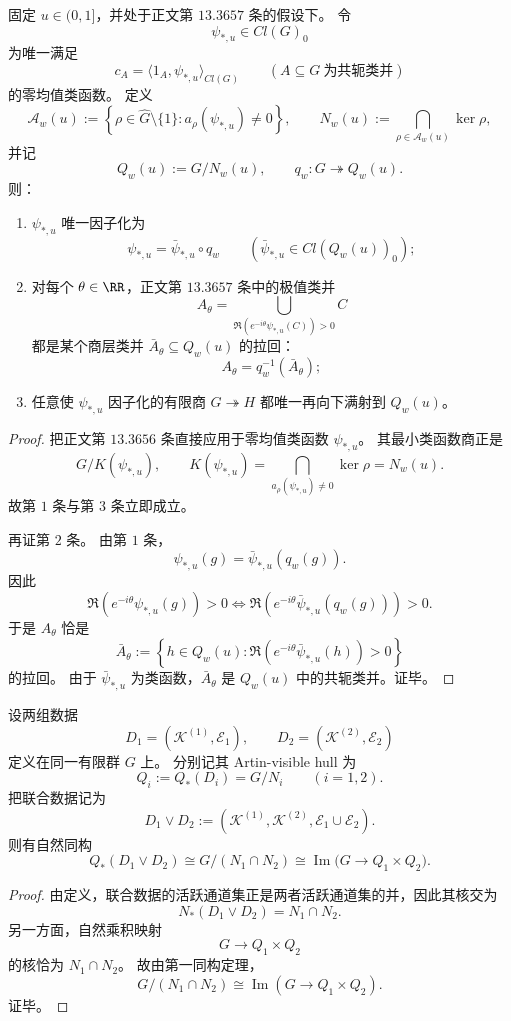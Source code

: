 \begin{theorem}[极大通道最优见证的唯一最小承载商]\label{thm:conclusion-artin-extremal-witness-minimal-hull}
固定 \(u\in(0,1]\)，并处于正文第 \(13.3657\) 条的假设下。
令
\[
\psi_{\ast,u}\in Cl(G)_0
\]
为唯一满足
\[
c_A=\langle 1_A,\psi_{\ast,u}\rangle_{Cl(G)}
\qquad
(A\subseteq G\ \text{为共轭类并})
\]
的零均值类函数。
定义
\[
\mathcal A_w(u)
:=
\left\{
\rho\in\widehat G\setminus\{1\}: a_\rho(\psi_{\ast,u})\neq 0
\right\},
\qquad
N_w(u):=\bigcap_{\rho\in\mathcal A_w(u)}\ker\rho,
\]
并记
\[
Q_w(u):=G/N_w(u),
\qquad
q_w:G\twoheadrightarrow Q_w(u).
\]
则：
\begin{enumerate}
  \item \(\psi_{\ast,u}\) 唯一因子化为
  \[
  \psi_{\ast,u}=\bar\psi_{\ast,u}\circ q_w
  \qquad
  (\bar\psi_{\ast,u}\in Cl(Q_w(u))_0);
  \]
  \item 对每个 \(\theta\in\RR\)，正文第 \(13.3657\) 条中的极值类并
  \[
  A_\theta=\bigcup_{\Re(e^{-i\theta}\psi_{\ast,u}(C))>0} C
  \]
  都是某个商层类并 \(\bar A_\theta\subseteq Q_w(u)\) 的拉回：
  \[
  A_\theta=q_w^{-1}(\bar A_\theta);
  \]
  \item 任意使 \(\psi_{\ast,u}\) 因子化的有限商 \(G\twoheadrightarrow H\) 都唯一再向下满射到 \(Q_w(u)\)。
\end{enumerate}
\end{theorem}

\begin{proof}
把正文第 \(13.3656\) 条直接应用于零均值类函数 \(\psi_{\ast,u}\)。
其最小类函数商正是
\[
G/K(\psi_{\ast,u}),
\qquad
K(\psi_{\ast,u})
=
\bigcap_{a_\rho(\psi_{\ast,u})\neq 0}\ker\rho
=
N_w(u).
\]
故第 \(1\) 条与第 \(3\) 条立即成立。

再证第 \(2\) 条。
由第 \(1\) 条，
\[
\psi_{\ast,u}(g)=\bar\psi_{\ast,u}(q_w(g)).
\]
因此
\[
\Re(e^{-i\theta}\psi_{\ast,u}(g))>0
\iff
\Re(e^{-i\theta}\bar\psi_{\ast,u}(q_w(g)))>0.
\]
于是 \(A_\theta\) 恰是
\[
\bar A_\theta:=
\left\{
h\in Q_w(u):
\Re(e^{-i\theta}\bar\psi_{\ast,u}(h))>0
\right\}
\]
的拉回。
由于 \(\bar\psi_{\ast,u}\) 为类函数，\(\bar A_\theta\) 是 \(Q_w(u)\) 中的共轭类并。证毕。
\end{proof}

\begin{theorem}[可见壳的融合律]\label{thm:conclusion-artin-visible-hull-fusion-law}
设两组数据
\[
D_1=(\mathcal K^{(1)},\mathcal E_1),
\qquad
D_2=(\mathcal K^{(2)},\mathcal E_2)
\]
定义在同一有限群 \(G\) 上。
分别记其 Artin-visible hull 为
\[
Q_i:=Q_\ast(D_i)=G/N_i
\qquad (i=1,2).
\]
把联合数据记为
\[
D_1\vee D_2:=
(\mathcal K^{(1)},\mathcal K^{(2)},\mathcal E_1\cup\mathcal E_2).
\]
则有自然同构
\[
Q_\ast(D_1\vee D_2)
\cong
G/(N_1\cap N_2)
\cong
\operatorname{Im}\bigl(G\to Q_1\times Q_2\bigr).
\]
\end{theorem}

\begin{proof}
由定义，联合数据的活跃通道集正是两者活跃通道集的并，因此其核交为
\[
N_\ast(D_1\vee D_2)=N_1\cap N_2.
\]
另一方面，自然乘积映射
\[
G\to Q_1\times Q_2
\]
的核恰为 \(N_1\cap N_2\)。
故由第一同构定理，
\[
G/(N_1\cap N_2)\cong \operatorname{Im}(G\to Q_1\times Q_2).
\]
证毕。
\end{proof}

\endinput
